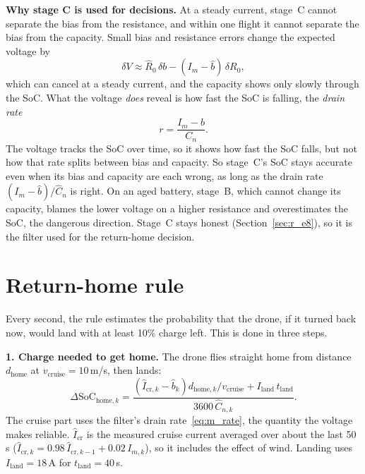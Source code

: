 \label{sec:m_ekf_choice}\textbf{Why stage C is used for decisions.} At a steady current, stage~C cannot separate the bias from the resistance, and within one flight it cannot separate the bias from the capacity. Small bias and resistance errors change the expected voltage by
\begin{equation}
  \delta V \approx \hat{R}_0\, \delta b - (I_m - \hat{b})\, \delta R_0 ,
  \label{eq:m_confound}
\end{equation}
which can cancel at a steady current, and the capacity shows only slowly through the SoC. What the voltage \emph{does} reveal is how fast the SoC is falling, the \emph{drain rate}
\begin{equation}
  r = \frac{I_m - b}{C_n}.
  \label{eq:m_rate}
\end{equation}
The voltage tracks the SoC over time, so it shows how fast the SoC falls, but not how that rate splits between bias and capacity. So stage~C's SoC stays accurate even when its bias and capacity are each wrong, as long as the drain rate $(I_m - \hat{b})/\hat{C}_n$ is right. On an aged battery, stage~B, which cannot change its capacity, blames the lower voltage on a higher resistance and overestimates the SoC, the dangerous direction. Stage~C stays honest (Section~\ref{sec:r_e8}), so it is the filter used for the return-home decision.

\section{Return-home rule}\label{sec:m_rth}

Every second, the rule estimates the probability that the drone, if it turned back now, would land with at least 10\% charge left. This is done in three steps.

\label{sec:m_rth_cost}\textbf{1. Charge needed to get home.} The drone flies straight home from distance $d_{\text{home}}$ at $v_{\text{cruise}} = 10$\,m/s, then lands:
\begin{equation}
  \Delta\mathrm{SoC}_{\text{home},k} = \frac{\left(\hat{I}_{\text{cr},k} - \hat{b}_k\right) d_{\text{home},k} / v_{\text{cruise}} + I_{\text{land}}\, t_{\text{land}}}{3600\, \hat{C}_{n,k}} .
  \label{eq:m_dsoc_home}
\end{equation}
The cruise part uses the filter's drain rate~\eqref{eq:m_rate}, the quantity the voltage makes reliable. $\hat{I}_{\text{cr}}$ is the measured cruise current averaged over about the last 50\,s ($\hat{I}_{\text{cr},k} = 0.98\, \hat{I}_{\text{cr},k-1} + 0.02\, I_{m,k}$), so it includes the effect of wind.\label{eq:m_icr} Landing uses $I_{\text{land}} = 18$\,A for $t_{\text{land}} = 40$\,s.

